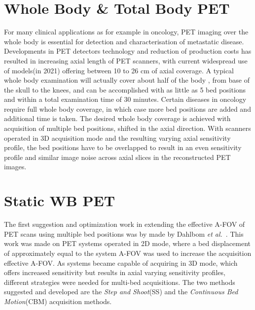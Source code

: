 \section{Whole Body \& Total Body PET}
For many clinical applications as for example in oncology, PET imaging over the whole body is essential for detection and characterisation of metastatic disease. Developments in PET detectors technology and reduction of production costs has resulted in increasing axial length of PET scanners, with current widespread use of models(in 2021) offering between 10 to 26 cm of axial coverage.
A typical whole body examination will actually cover about half of the body , from base of the skull to the knees, and can be accomplished with as little as 5 bed positions and within a total examination time of 30 minutes. Certain diseases in oncology require full whole body coverage, in which case more bed positions are added and additional time is taken. 
The desired whole body coverage is achieved with acquisition of multiple bed positions, shifted in the axial direction. With scanners operated in 3D acquisition mode and the resulting varying axial sensitivity profile, the bed positions have to be overlapped to result in an even sensitivity profile and similar image noise across axial slices in the reconstructed PET images. 

\section{Static WB PET}
The first suggestion and optimization work in extending the effective A-FOV of PET scans using multiple bed positions was by made by Dahlbom \textit{et al.}~\cite{Dahlbom1992}. This work was made on PET systems operated in 2D mode, where a bed displacement of approximately equal to the system A-FOV was used to increase the acquisition effective A-FOV. As systems became capable of acquiring in 3D mode, which offers increased sensitivity but results in axial varying sensitivity profiles, different strategies were needed for multi-bed acquisitions. The two methods suggested and developed are the \textit{Step and Shoot}(SS) and the \textit{Continuous Bed Motion}(CBM) acquisition methods. 

